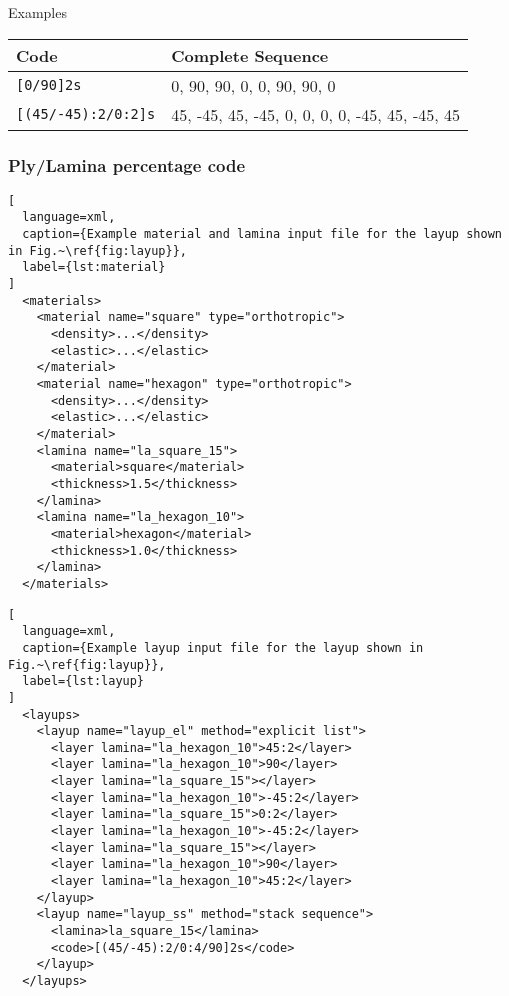 \documentclass{book}
\begin{document}
Examples

\begin{table}
  \centering
  \begin{tabular}{ll}
    \toprule
    Code & Complete Sequence \\
    \midrule
    \verb|[0/90]2s| & 0, 90, 90, 0, 0, 90, 90, 0 \\
    \verb|[(45/-45):2/0:2]s| & 45, -45, 45, -45, 0, 0, 0, 0, -45, 45, -45, 45 \\
    \bottomrule
  \end{tabular}
\end{table}

\subsubsection{Ply/Lamina percentage code}


\begin{lstlisting}[
  language=xml,
  caption={Example material and lamina input file for the layup shown in Fig.~\ref{fig:layup}},
  label={lst:material}
]
  <materials>
    <material name="square" type="orthotropic">
      <density>...</density>
      <elastic>...</elastic>
    </material>
    <material name="hexagon" type="orthotropic">
      <density>...</density>
      <elastic>...</elastic>
    </material>
    <lamina name="la_square_15">
      <material>square</material>
      <thickness>1.5</thickness>
    </lamina>
    <lamina name="la_hexagon_10">
      <material>hexagon</material>
      <thickness>1.0</thickness>
    </lamina>
  </materials>
\end{lstlisting}

\begin{lstlisting}[
  language=xml,
  caption={Example layup input file for the layup shown in Fig.~\ref{fig:layup}},
  label={lst:layup}
]
  <layups>
    <layup name="layup_el" method="explicit list">
      <layer lamina="la_hexagon_10">45:2</layer>
      <layer lamina="la_hexagon_10">90</layer>
      <layer lamina="la_square_15"></layer>
      <layer lamina="la_hexagon_10">-45:2</layer>
      <layer lamina="la_square_15">0:2</layer>
      <layer lamina="la_hexagon_10">-45:2</layer>
      <layer lamina="la_square_15"></layer>
      <layer lamina="la_hexagon_10">90</layer>
      <layer lamina="la_hexagon_10">45:2</layer>
    </layup>
    <layup name="layup_ss" method="stack sequence">
      <lamina>la_square_15</lamina>
      <code>[(45/-45):2/0:4/90]2s</code>
    </layup>
  </layups>
\end{lstlisting}
\end{document}
